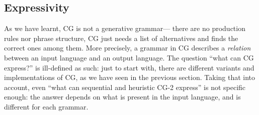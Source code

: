   


\subsection{Expressivity}
\label{sec:expressivity}




As we have learnt, CG is not a generative grammar---
there are no production rules nor phrase structure,
CG just needs a list of alternatives and finds the correct ones among them.
More precisely, a grammar in CG describes a \emph{relation} between an input language 
and an output language. %
The question ``what can CG express?'' is ill-defined as such: 
just to start with, there are different variants and implementations of CG, as we have seen in the previous section.
Taking that into account, even ``what can sequential and heuristic CG-2 express'' is not specific enough: 
the answer depends on what is present in the input language, and is different for each grammar.

